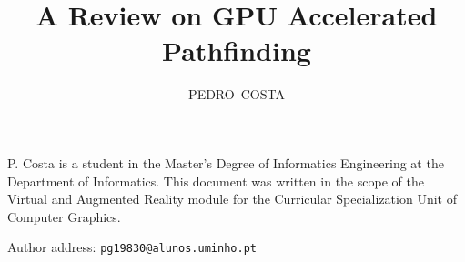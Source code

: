 \documentclass{acmtog}
\begin{document}

\title{A Review on GPU Accelerated Pathfinding} %

\author{PEDRO~COSTA%
}





\maketitle

\begin{bottomstuff} 
P. Costa is a student in the Master's Degree of Informatics Engineering at the Department of Informatics. This document was written in the scope of the Virtual and Augmented Reality module for the Curricular Specialization Unit of Computer Graphics.

Author address: \texttt{pg19830@alunos.uminho.pt}
\end{bottomstuff}





\end{document}
